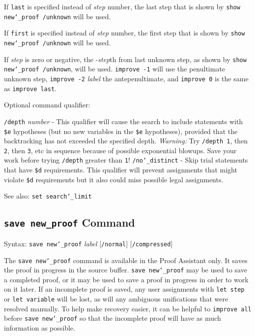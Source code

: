If \texttt{last} is specified instead of {\em step} number, the last
step that is shown by \texttt{show new{\char`\_}proof /unknown} will be
used.

If \texttt{first} is specified instead of {\em step} number, the first
step that is shown by \texttt{show new{\char`\_}proof /unknown} will be
used.

If {\em step} is zero or negative, the -{\em step}th from last unknown
step, as shown by \texttt{show new{\char`\_}proof /unknown}, will be
used.  \texttt{improve -1} will use the penultimate
unknown step, \texttt{improve -2} {\em label} the antepenultimate, and
\texttt{improve 0} is the same as \texttt{improve last}.

Optional command qualifier:

    \texttt{/depth} {\em number} - This qualifier will cause the search
        to include
        statements with \texttt{\$e} hypotheses (but no new variables in
        the \texttt{\$e}
        hypotheses), provided that the backtracking has not exceeded the
        specified depth. {\em Warning:}  Try \texttt{/depth 1},
        then \texttt{2}, then \texttt{3}, etc
        in sequence because of possible exponential blowups.  Save your
        work before trying \texttt{/depth} greater than \texttt{1}!
    \texttt{/no{\char`\_}distinct} - Skip trial statements that have
        \texttt{\$d} requirements.
        This qualifier will prevent assignments that might violate \texttt{\$d}
        requirements but it also could miss possible legal assignments.

See also: \texttt{set search{\char`\_}limit}

\subsection{\texttt{save new\_proof} Command}
Syntax:  \texttt{save new{\char`\_}proof} {\em label} [\texttt{/normal}]
   [\texttt{/compressed}]

The \texttt{save new{\char`\_}proof} command is available in the Proof
Assistant only.  It saves the proof in progress in the source
buffer.  \texttt{save new{\char`\_}proof} may be
used to save a completed proof, or it may be used to save a proof in
progress in order to work on it later.  If an incomplete proof is saved,
any user assignments with \texttt{let step} or \texttt{let variable}
will be lost, as will any ambiguous unifications that were resolved manually.
To help make recovery easier, it can be helpful to \texttt{improve all}
before \texttt{save new{\char`\_}proof} so that the incomplete proof
will have as much information as possible.

